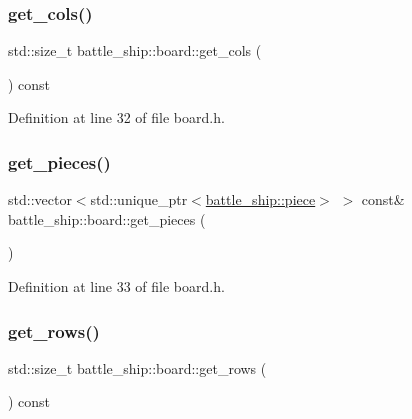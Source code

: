 \mbox{\label{classbattle__ship_1_1board_ad3d5995d4b8a0af0cfc802a1731f6a6d}} 
\subsubsection{\texorpdfstring{get\+\_\+cols()}{get\_cols()}}
{\footnotesize\ttfamily std\+::size\+\_\+t battle\+\_\+ship\+::board\+::get\+\_\+cols (\begin{DoxyParamCaption}{ }\end{DoxyParamCaption}) const\hspace{0.3cm}{\ttfamily [inline]}}



Definition at line 32 of file board.\+h.

\mbox{\label{classbattle__ship_1_1board_a12358d2f6eabd200d7f4e8f7276ffc96}} 
\subsubsection{\texorpdfstring{get\+\_\+pieces()}{get\_pieces()}}
{\footnotesize\ttfamily std\+::vector$<$std\+::unique\+\_\+ptr$<$\hyperlink{classbattle__ship_1_1piece}{battle\+\_\+ship\+::piece}$>$ $>$ const\& battle\+\_\+ship\+::board\+::get\+\_\+pieces (\begin{DoxyParamCaption}{ }\end{DoxyParamCaption})\hspace{0.3cm}{\ttfamily [inline]}}



Definition at line 33 of file board.\+h.

\mbox{\label{classbattle__ship_1_1board_a74cf4399466cad172160f005da6d45fa}} 
\subsubsection{\texorpdfstring{get\+\_\+rows()}{get\_rows()}}
{\footnotesize\ttfamily std\+::size\+\_\+t battle\+\_\+ship\+::board\+::get\+\_\+rows (\begin{DoxyParamCaption}{ }\end{DoxyParamCaption}) const\hspace{0.3cm}{\ttfamily [inline]}}



